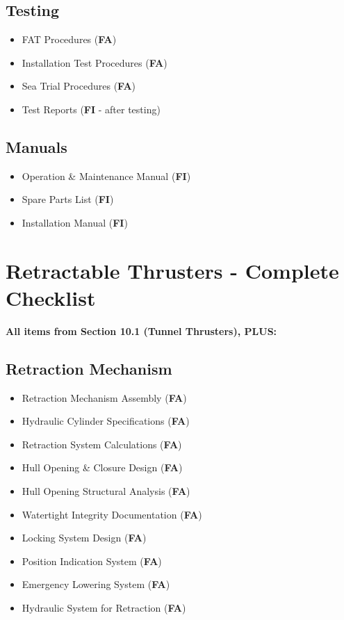 \documentclass[11pt,a4paper]{report}
\newcommand{\fa}{\textbf{\textcolor{warningred}{FA}}}
\newcommand{\fic}{\textbf{\textcolor{bvgray}{FI}}}
\begin{document}
\subsection{Testing}
\begin{itemize}[label=$\square$]
\item FAT Procedures (\fa{})
\item Installation Test Procedures (\fa{})
\item Sea Trial Procedures (\fa{})
\item Test Reports (\fic{} - after testing)
\end{itemize}

\subsection{Manuals}
\begin{itemize}[label=$\square$]
\item Operation \& Maintenance Manual (\fic{})
\item Spare Parts List (\fic{})
\item Installation Manual (\fic{})
\end{itemize}

\section{Retractable Thrusters - Complete Checklist}

\textbf{All items from Section 10.1 (Tunnel Thrusters), PLUS:}

\subsection{Retraction Mechanism}
\begin{itemize}[label=$\square$]
\item Retraction Mechanism Assembly (\fa{})
\item Hydraulic Cylinder Specifications (\fa{})
\item Retraction System Calculations (\fa{})
\item Hull Opening \& Closure Design (\fa{})
\item Hull Opening Structural Analysis (\fa{})
\item Watertight Integrity Documentation (\fa{})
\item Locking System Design (\fa{})
\item Position Indication System (\fa{})
\item Emergency Lowering System (\fa{})
\item Hydraulic System for Retraction (\fa{})
\end{itemize}
\end{document}
